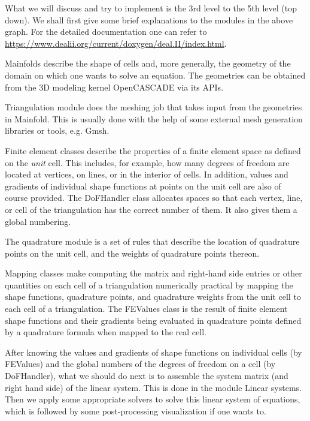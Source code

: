 	What we will discuss and try to implement is the 3rd level to the 5th level
	(top down). We shall first give some brief explanations to the modules in 
	the	above graph. For the detailed documentation one can refer to
	\url{https://www.dealii.org/current/doxygen/deal.II/index.html}.
	
	Mainfolds describe the shape of cells and, more generally, the geometry of 
	the domain on which one wants to solve an equation. The geometries can be
	obtained from the 3D modeling kernel OpenCASCADE via its APIs.
	
	Triangulation module does the meshing job that takes input from the
	geometries in Mainfold. This is usually done with the help of some
	external mesh generation libraries or tools, e.g. Gmsh. 
	
	Finite element classes describe the properties of a finite element space as 
	defined on the \emph{unit} cell. This includes, for example, how many 
	degrees of freedom are located at vertices, on lines, or in the interior of 
	cells. In addition, values and gradients of individual shape functions at 
	points on the unit cell are also of course provided. The DoFHandler class 
	allocates spaces so that each vertex, line, or cell of the triangulation 
	has the correct number of them. It also gives them a global numbering.
	
	The quadrature module is a set of rules that describe the location of 
	quadrature points on the unit cell, and the weights of quadrature points 
	thereon.
	
	Mapping classes make computing the matrix and right-hand side entries or 
	other quantities on each cell of a triangulation numerically practical by 
	mapping the shape functions, quadrature points, and quadrature weights from 
	the unit cell to each cell of a triangulation. The FEValues class is the 
	result of finite element shape functions and their gradients being 
	evaluated in quadrature points defined by a quadrature formula when mapped 
	to the real cell.
	
	After knowing the values and gradients of shape functions on individual 
	cells (by FEValues) and the global numbers of the degrees of freedom on a 
	cell (by DoFHandler), what we should do next is to assemble the system 
	matrix (and right hand side) of the linear system. This is done in the
	module Linear systems. Then we apply some appropriate solvers to solve
	this linear system of equations, which is followed by some post-processing
	visualization if one wants to.\vspace{8pt}
	
